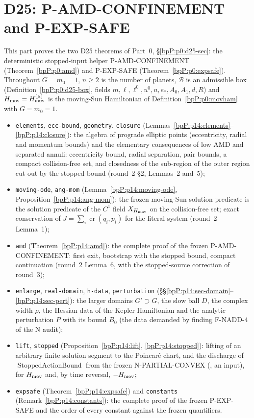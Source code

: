 \section{D25: P-AMD-CONFINEMENT and P-EXP-SAFE}\label{bpP:p14}
\begingroup\sloppy

This part proves the two D25 theorems of Part~0, \S\ref{bpP:p0:d25-sec}: the deterministic stopped-input helper
P-AMD-CONFINEMENT (Theorem~\ref{bpP:p0:amd}) and P-EXP-SAFE (Theorem~\ref{bpP:p0:expsafe}). Throughout $G=m_0=1$, $n\ge2$ is the number of planets,
$\mathcal B$ is an admissible box (Definition~\ref{bpP:p0:d25-box}, fields $m,\ell,\ell^0,u^0,u,e_*,A_0,A_1,d,R$) and $H_{\rm mov}=H_{\rm mov}^{(\mu)}$ is the moving-Sun Hamiltonian
of Definition~\ref{bpP:p0:movham} with $G=m_0=1$.
\begin{itemize}
\item \texttt{elements}, \texttt{ecc-bound}, \texttt{geometry}, \texttt{closure} (Lemmas~\ref{bpP:p14:elements}--\ref{bpP:p14:closure}): the algebra of prograde elliptic points (eccentricity, radial and momentum bounds) and the elementary
  consequences of low AMD and separated annuli: eccentricity bound, radial separation, pair bounds, a compact collision-free set, and closedness of the sub-region of the outer region cut out by the stopped bound (round~2 \S2, Lemmas~2 and~5);
\item \texttt{moving-ode}, \texttt{ang-mom} (Lemma~\ref{bpP:p14:moving-ode}, Proposition~\ref{bpP:p14:ang-mom}): the frozen moving-Sun solution predicate is the solution predicate of the $C^1$ field $X_{H_{\rm mov}}$ on the collision-free set; exact conservation of $J=\sum_i\operatorname{cr}(q_i,p_i)$ for the literal system (round~2 Lemma~1);
\item \texttt{amd} (Theorem~\ref{bpP:p14:amd}): the complete proof of the frozen P-AMD-CONFINEMENT: first exit, bootstrap with the stopped bound, compact continuation (round~2 Lemma~6, with the stopped-source correction of round~3);
\item \texttt{enlarge}, \texttt{real-domain}, \texttt{h-data}, \texttt{perturbation} (\S\S\ref{bpP:p14:sec-domain}--\ref{bpP:p14:sec-pert}): the larger domains $G'\supset G$, the slow ball $D$, the complex width $\rho$, the Hessian data of the Kepler Hamiltonian and the analytic perturbation $P$ with its bound $B_0$ (the data demanded by finding F-NADD-4 of the N audit);
\item \texttt{lift}, \texttt{stopped} (Proposition~\ref{bpP:p14:lift}, \ref{bpP:p14:stopped}): lifting of an arbitrary finite solution segment to the Poincar\'e chart, and the discharge of $\operatorname{StoppedActionBound}$ from the frozen N-PARTIAL-CONVEX (, an input), for $H_{\rm mov}$ and, by time reversal, $-H_{\rm mov}$;
\item \texttt{expsafe} (Theorem~\ref{bpP:p14:expsafe}) and \texttt{constants} (Remark~\ref{bpP:p14:constants}): the complete proof of the frozen P-EXP-SAFE and the order of every constant against the frozen quantifiers.
\end{itemize}

